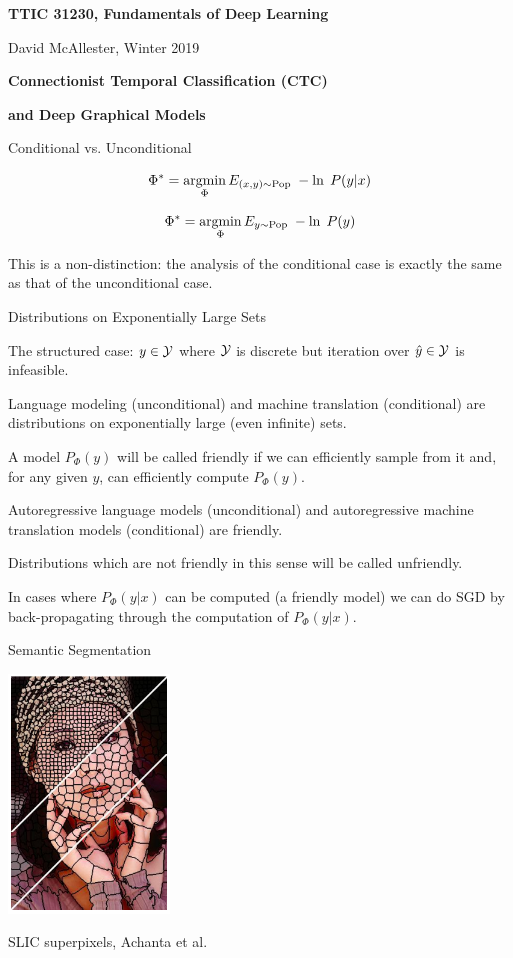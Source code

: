




{\Huge

  \centerline{\bf TTIC 31230, Fundamentals of Deep Learning}
  \bigskip
  \centerline{David McAllester, Winter 2019}
  \vfill
  \centerline{\bf Connectionist Temporal Classification (CTC)}
  \vfill
  \centerline{\bf and Deep Graphical Models}
\vfill
\vfill
\vfill
{}
{Conditional vs. Unconditional}

\vfill
{\color{red}
$$\Phi^* = \operatorname*{argmin}_\Phi E_{(x,y) \sim \mathrm{Pop}}\;-\ln \;P(y|x)$$

\vfill
$$\Phi^* = \operatorname*{argmin}_\Phi E_{y \sim \mathrm{Pop}}\;-\ln \;P(y)$$
}

\vfill
This is a non-distinction: the analysis of the conditional case
is exactly the same as that of the unconditional case.

{Distributions on Exponentially Large Sets}

{\color{red} The structured case:} $y \in {\cal Y}$ where ${\cal Y}$ is discrete but {\color{red} iteration over $\hat{y} \in {\cal Y}$ is infeasible}.

\vfill
Language modeling (unconditional) and machine translation (conditional) are distributions on exponentially large (even infinite) sets.


A model $P_\Phi(y)$ will be called {\color{red} friendly} if we can efficiently sample from it and, for any given $y$, can efficiently compute $P_\Phi(y)$.

\vfill
{\color{red} Autoregressive} language models (unconditional) and autoregressive machine translation models (conditional) are {\color{red} friendly}.


\vfill
Distributions which are not friendly in this sense will be called {\color{red} unfriendly}.



In cases where $P_\Phi(y|x)$ can be computed (a friendly model)
we can do SGD by back-propagating through the computation of $P_\Phi(y|x)$.



{Semantic Segmentation}
\centerline{\includegraphics[height = 2.5in]{../images/SLICcolor}}
\centerline{\huge SLIC superpixels, Achanta et al.}

}
